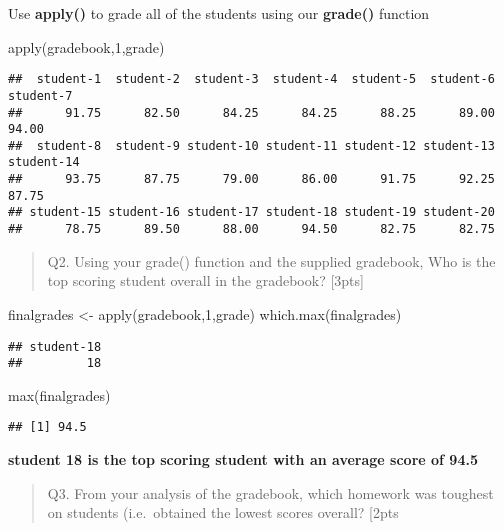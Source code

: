 \documentclass[
]{article}
\newenvironment{Shaded}{\begin{snugshade}}{\end{snugshade}}
\newcommand{\DecValTok}[1]{\textcolor[rgb]{0.00,0.00,0.81}{#1}}
\newcommand{\FunctionTok}[1]{\textcolor[rgb]{0.00,0.00,0.00}{#1}}
\newcommand{\NormalTok}[1]{#1}
\newcommand{\OtherTok}[1]{\textcolor[rgb]{0.56,0.35,0.01}{#1}}
\begin{document}
Use \textbf{apply()} to grade all of the students using our
\textbf{grade()} function

\begin{Shaded}
\begin{Highlighting}[]
\FunctionTok{apply}\NormalTok{(gradebook,}\DecValTok{1}\NormalTok{,grade)}
\end{Highlighting}
\end{Shaded}

\begin{verbatim}
##  student-1  student-2  student-3  student-4  student-5  student-6  student-7 
##      91.75      82.50      84.25      84.25      88.25      89.00      94.00 
##  student-8  student-9 student-10 student-11 student-12 student-13 student-14 
##      93.75      87.75      79.00      86.00      91.75      92.25      87.75 
## student-15 student-16 student-17 student-18 student-19 student-20 
##      78.75      89.50      88.00      94.50      82.75      82.75
\end{verbatim}

\begin{quote}
Q2. Using your grade() function and the supplied gradebook, Who is the
top scoring student overall in the gradebook? {[}3pts{]}
\end{quote}

\begin{Shaded}
\begin{Highlighting}[]
\NormalTok{finalgrades }\OtherTok{\textless{}{-}} \FunctionTok{apply}\NormalTok{(gradebook,}\DecValTok{1}\NormalTok{,grade)}
\FunctionTok{which.max}\NormalTok{(finalgrades)}
\end{Highlighting}
\end{Shaded}

\begin{verbatim}
## student-18 
##         18
\end{verbatim}

\begin{Shaded}
\begin{Highlighting}[]
\FunctionTok{max}\NormalTok{(finalgrades)}
\end{Highlighting}
\end{Shaded}

\begin{verbatim}
## [1] 94.5
\end{verbatim}

\textbf{student 18 is the top scoring student with an average score of
94.5}

\begin{quote}
Q3. From your analysis of the gradebook, which homework was toughest on
students (i.e.~obtained the lowest scores overall? {[}2pts
\end{quote}
\end{document}
